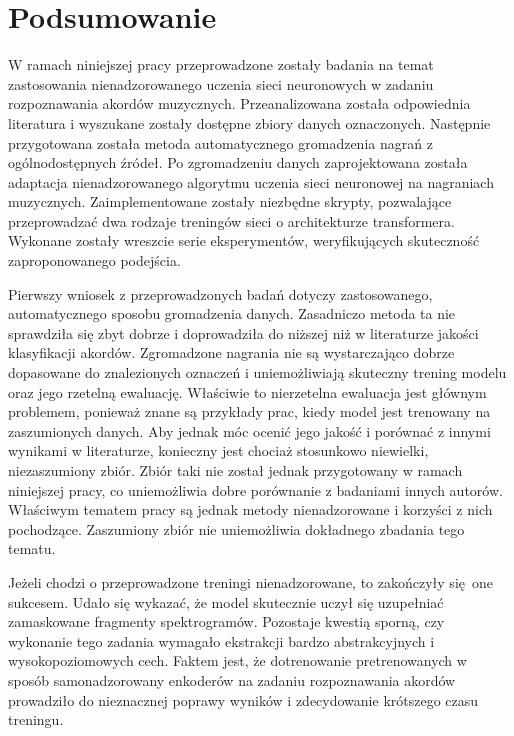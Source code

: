 \chapter{Podsumowanie} \label{chapter:summary}

W ramach niniejszej pracy przeprowadzone zostały badania na temat zastosowania nienadzorowanego uczenia sieci neuronowych w zadaniu rozpoznawania akordów muzycznych. Przeanalizowana została odpowiednia literatura i wyszukane zostały dostępne zbiory danych oznaczonych. Następnie przygotowana została metoda automatycznego gromadzenia nagrań z ogólnodostępnych źródeł. Po zgromadzeniu danych zaprojektowana została adaptacja nienadzorowanego algorytmu uczenia sieci neuronowej na nagraniach muzycznych. Zaimplementowane zostały niezbędne skrypty, pozwalające przeprowadzać dwa rodzaje treningów sieci o architekturze transformera. Wykonane zostały wreszcie serie eksperymentów, weryfikujących skuteczność zaproponowanego podejścia.

Pierwszy wniosek z przeprowadzonych badań dotyczy zastosowanego, automatycznego sposobu gromadzenia danych. Zasadniczo metoda ta nie sprawdziła się zbyt dobrze i doprowadziła do niższej niż w literaturze jakości klasyfikacji akordów. Zgromadzone nagrania nie są wystarczająco dobrze dopasowane do znalezionych oznaczeń i uniemożliwiają skuteczny trening modelu oraz jego rzetelną ewaluację. Właściwie to nierzetelna ewaluacja jest głównym problemem, ponieważ znane są przykłady prac, kiedy model jest trenowany na zaszumionych danych. Aby jednak móc ocenić jego jakość i porównać z innymi wynikami w literaturze, konieczny jest chociaż stosunkowo niewielki, niezaszumiony zbiór. Zbiór taki nie został jednak przygotowany w ramach niniejszej pracy, co uniemożliwia dobre porównanie z badaniami innych autorów. Właściwym tematem pracy są jednak metody nienadzorowane i korzyści z nich pochodzące. Zaszumiony zbiór nie uniemożliwia dokładnego zbadania tego tematu.

Jeżeli chodzi o przeprowadzone treningi nienadzorowane, to zakończyły się one sukcesem. Udało się wykazać, że model skutecznie uczył się uzupełniać zamaskowane fragmenty spektrogramów. Pozostaje kwestią sporną, czy wykonanie tego zadania wymagało ekstrakcji bardzo abstrakcyjnych i wysokopoziomowych cech. Faktem jest, że dotrenowanie pretrenowanych w sposób samonadzorowany enkoderów na zadaniu rozpoznawania akordów prowadziło do nieznacznej poprawy wyników i zdecydowanie krótszego czasu treningu.

